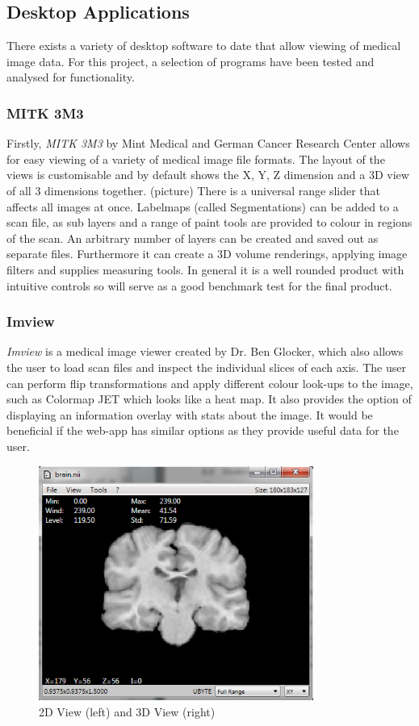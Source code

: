 \documentclass[a4paper,11pt,titlepage]{article}
\begin{document}
\subsection{Desktop Applications}

There exists a variety of desktop software to date that allow viewing of medical image data. For this project, a selection of programs have been tested and analysed for functionality.

\subsubsection{MITK 3M3}
Firstly, \textit{MITK 3M3} by Mint Medical and German Cancer Research Center allows for easy viewing of a variety of medical image file formats. The layout of the views is customisable and by default shows the X, Y, Z dimension and a 3D view of all 3 dimensions together. (picture) There is a universal range slider that affects all images at once. Labelmaps (called Segmentations) can be added to a scan file, as sub layers and a range of paint tools are provided to colour in regions of the scan. An arbitrary number of layers can be created and saved out as separate files. 
Furthermore it can create a 3D volume renderings, applying image filters and supplies measuring tools. In general it is a well rounded product with intuitive controls so will serve as a good benchmark test for the final product.

\subsubsection{Imview}
\textit{Imview} is a medical image viewer created by Dr. Ben Glocker, which also allows the user to load scan files and inspect the individual slices of each axis. The user can perform flip transformations and apply different colour look-ups to the image, such as Colormap JET which looks like a heat map. It also provides the option of displaying an information overlay with stats about the image. It would be beneficial if the web-app has similar options as they provide useful data for the user.


\begin{figure}[ht!]
\centering
\includegraphics[width=90mm]{..//literatureSurvey/graphics/imview_01.png}
\caption{2D View (left) and 3D View (right)}
\label{fig:UIdesign1}
\end{figure}
\end{document}
